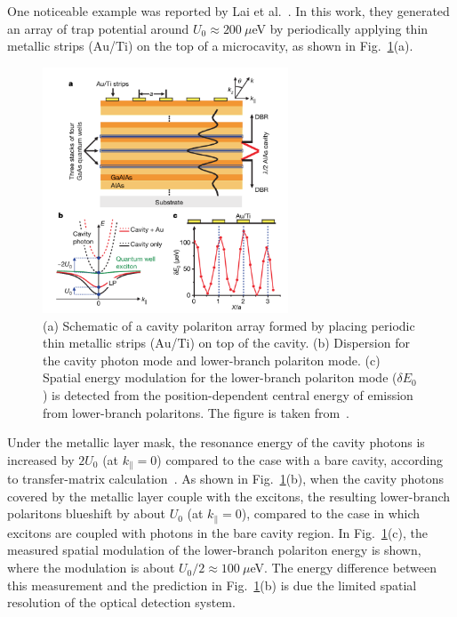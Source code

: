 One noticeable example was reported by Lai et al.~\cite{Lai:2007aa}.
In this work, they generated an array of trap potential around $U_0\approx200~\mu$eV by periodically applying thin metallic strips ($\mathrm{Au}$/$\mathrm{Ti}$) on the top of a microcavity, as shown in Fig.~\ref{fig:Ch1_periodic}(a).
%
\begin{figure}[ht]
    \centering
    \includegraphics[width=0.65\textwidth]{Fig/Ch1/periodic.png}
    \caption[Polariton condensation in a periodic structure]{(a) Schematic of a cavity polariton array formed by placing periodic thin metallic strips ($\mathrm{Au}$/$\mathrm{Ti}$) on top of the cavity. (b) Dispersion for the cavity photon mode and lower-branch polariton mode. (c) Spatial energy modulation for the lower-branch polariton mode ($\delta E_0$) is detected from the position-dependent central energy of emission from lower-branch polaritons. The figure is taken from~\cite{Lai:2007aa}.}
    \label{fig:Ch1_periodic}
\end{figure}
%

Under the metallic layer mask, the resonance energy of the cavity photons is increased by $2U_0$ (at $k_\parallel=0$) compared to the case with a bare cavity, according to transfer-matrix calculation~\cite{Yeh:1988aa}.
As shown in Fig.~\ref{fig:Ch1_periodic}(b), when the cavity photons covered by the metallic layer couple with the excitons, the resulting lower-branch polaritons blueshift by about $U_0$ (at $k_\parallel=0$), compared to the case in which excitons are coupled with photons in the bare cavity region.
In Fig.~\ref{fig:Ch1_periodic}(c), the measured spatial modulation of the lower-branch polariton energy is shown, where the modulation is about $U_0/2\approx 100~\mu$eV. 
The energy difference between this measurement and the prediction in Fig.~\ref{fig:Ch1_periodic}(b) is due the limited spatial resolution of the optical detection system.

